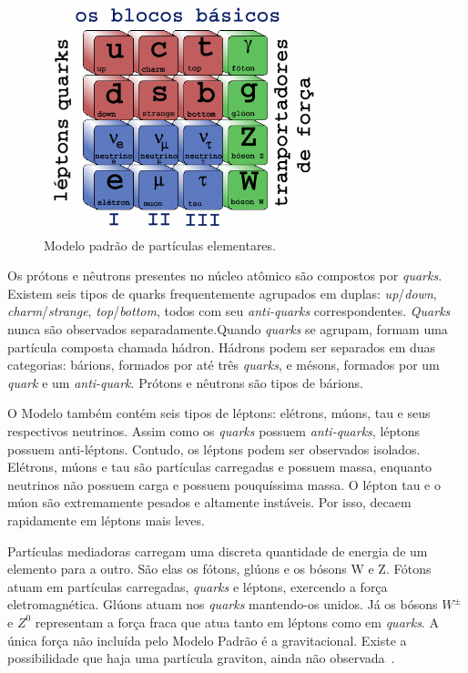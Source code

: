\begin{figure}[htpb!]
    \centering
    \includegraphics[width=8cm]{images/modelo_padrao.png}
    \caption{Modelo padrão de partículas elementares.}
    \label{fig:modelopadrao}
\end{figure}

Os prótons e nêutrons presentes no núcleo atômico  são compostos por
\emph{quarks}. Existem seis tipos de quarks frequentemente agrupados em duplas:
\emph{up}/\emph{down}, \emph{charm}/\emph{strange}, \emph{top}/\emph{bottom},
todos com seu \emph{anti-quarks} correspondentes. \emph{Quarks} nunca são
observados separadamente.Quando \emph{quarks} se agrupam, formam uma partícula
composta chamada hádron.  Hádrons podem ser separados em duas categorias:
bárions, formados por até três \emph{quarks}, e mésons, formados por um
\emph{quark} e um \emph{anti-quark}.  Prótons e nêutrons são tipos de bárions.

O Modelo também contém seis tipos de léptons: elétrons, múons, tau e seus
respectivos neutrinos. Assim como os \emph{quarks} possuem \emph{anti-quarks},
léptons possuem anti-léptons. Contudo, os léptons podem ser observados
isolados. Elétrons, múons e tau são partículas carregadas e possuem massa,
enquanto neutrinos não possuem carga e possuem pouquíssima massa.  O lépton tau
e o múon são extremamente pesados e altamente instáveis. Por isso, decaem
rapidamente em léptons mais leves.

Partículas mediadoras carregam uma discreta quantidade de energia de um
elemento para a outro. São elas os fótons, glúons e os bósons W e Z. Fótons
atuam em partículas carregadas, \emph{quarks} e léptons, exercendo a força
eletromagnética. Glúons atuam nos \emph{quarks} mantendo-os unidos. Já os
bósons $W^\pm$ e $Z^0$ representam a força fraca que atua tanto em léptons como em
\emph{quarks}.  A única força não incluída pelo Modelo Padrão é a
gravitacional. Existe a possibilidade que haja uma partícula graviton, ainda
não observada~\cite{PERKINS2000}.


